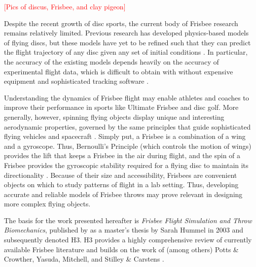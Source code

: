 \documentclass[a4paper,12pt, oneside]{article}
\newcommand{\red}[1]{\textcolor{red}{#1}}
\begin{document}
\red{[Pics of discus, Frisbee, and clay pigeon]}

Despite the recent growth of disc sports, the current body of Frisbee research remains relatively limited. Previous research has developed physics-based models of flying discs, but these models have yet to be refined such that they can predict the flight trajectory of any disc given any set of initial conditions \cite{H3, pottsandcrowther2007, yasuda, mitchell, stilleyandcarstens, morrison}. In particular, the accuracy of the existing models depends heavily on the accuracy of experimental flight data, which is difficult to obtain with without expensive equipment and sophisticated tracking software \cite{H3}.

Understanding the dynamics of Frisbee flight may enable athletes and coaches to improve their performance in sports like Ultimate Frisbee and disc golf.  More generally, however, spinning flying objects display unique and interesting aerodynamic properties, governed by the same principles that guide sophisticated flying vehicles and spacecraft \cite{lorenz2004}. Simply put, a Frisbee is a combination of a wing and a gyroscope. Thus, Bernoulli's Principle (which controls the motion of wings) provides the lift that keeps a Frisbee in the air during flight, and the spin of a Frisbee provides the gyroscopic stability required for a flying disc to maintain its directionality \cite{morrison}. Because of their size and accessibility, Frisbees are convenient objects on which to study patterns of flight in a lab setting. Thus, developing accurate and reliable models of Frisbee throws may prove relevant in designing more complex flying objects. 
 
The basis for the work presented hereafter is \textit{Frisbee Flight Simulation and Throw Biomechanics}, published by as a master's thesis by Sarah Hummel in 2003 and subsequently denoted H3. H3 provides a highly comprehensive review of currently available Frisbee literature and builds on the work of (among others) Potts \& Crowther, Yasuda, Mitchell, and Stilley \& Carstens \cite{H3, pottsandcrowther2007, yasuda, mitchell, stilleyandcarstens}. 
\end{document}
